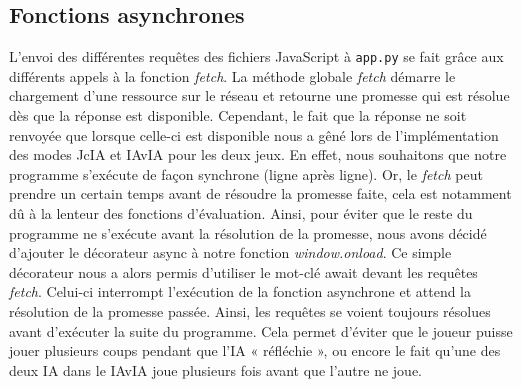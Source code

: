 \subsection{Fonctions asynchrones}
L'envoi des différentes requêtes des fichiers JavaScript à \texttt{app.py} se fait grâce aux différents appels à la fonction \textit{fetch}.
La méthode globale \textit{fetch} démarre le chargement d'une ressource sur le réseau et retourne une promesse qui est résolue dès que la 
réponse est disponible. Cependant, le fait que la réponse ne soit renvoyée que lorsque celle-ci est disponible nous a gêné lors de l'implémentation
des modes JcIA et IAvIA pour les deux jeux. En effet, nous souhaitons que notre programme s'exécute de façon synchrone (ligne après ligne). 
Or, le \textit{fetch} peut prendre un certain temps avant de résoudre la promesse faite, cela est notamment dû à la lenteur des fonctions d'évaluation.
Ainsi, pour éviter que le reste du programme ne s'exécute avant la résolution de la promesse, nous avons décidé d'ajouter le décorateur 
\textsf{async} à notre fonction \textit{window.onload}. Ce simple décorateur nous a alors permis d'utiliser le mot-clé \textsf{await} devant les requêtes \textit{fetch}.
Celui-ci interrompt l'exécution de la fonction asynchrone et attend la résolution de la promesse passée. Ainsi, les requêtes se voient toujours résolues 
avant d'exécuter la suite du programme. Cela permet d'éviter que le joueur puisse jouer plusieurs coups pendant que l'IA « réfléchie », ou encore le fait
qu'une des deux IA dans le IAvIA joue plusieurs fois avant que l'autre ne joue.
